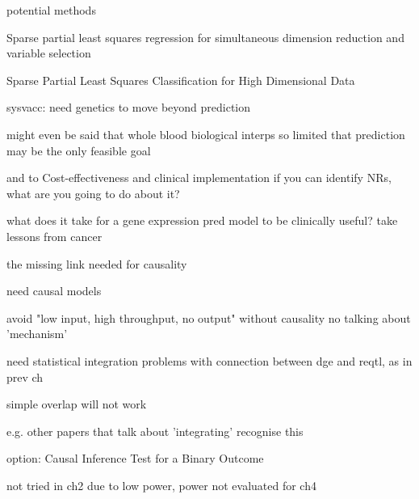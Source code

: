 \begin{outline}

        potential methods

            Sparse partial least squares regression for simultaneous dimension reduction and variable selection

             Sparse Partial Least Squares Classification for High Dimensional Data 

        sysvacc: need genetics to move beyond prediction

    might even be said that whole blood biological interps so limited that prediction may be the only feasible goal

    and to Cost-effectiveness and clinical implementation
        if you can identify NRs, what are you going to do about it?

        what does it take for a gene expression pred model to be clinically useful?
            take lessons from cancer

the missing link needed for causality

    need causal models

        avoid "low input, high throughput, no output"
        without causality no talking about 'mechanism'

    need statistical integration
        problems with connection between dge and reqtl, as in prev ch

        simple overlap will not work

            e.g. other papers that talk about 'integrating' recognise this

    option:
        Causal Inference Test for a Binary Outcome

            not tried in ch2 due to low power, power not evaluated for ch4


\end{outline}
